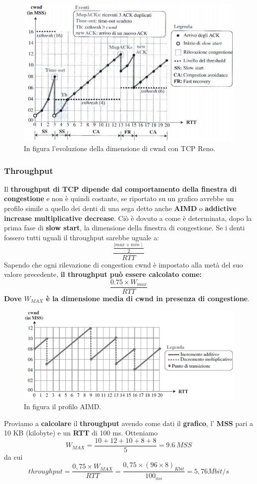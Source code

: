 \documentclass[11pt,a4paper,oneside]{book}
\theoremstyle{definition}
\begin{document}
\begin{figure}[!h]
	\includegraphics[scale=0.31]{Immagini/Reno2.png}
	\centering
	\caption{In figura l'evoluzione della dimensione di cwnd con TCP Reno.}
\end{figure}

\pagebreak

\subsubsection{Throughput}
Il \textbf{throughput di TCP dipende dal comportamento della finestra di congestione} e non è quindi costante, se riportato su un grafico avrebbe un profilo simile a quello dei denti di una sega detto anche \textbf{AIMD} o \textbf{addictive increase multiplicative decrease}. Ciò è dovuto a come è determinata, dopo la prima fase di \textbf{slow start}, la dimensione della finestra di congestione. Se i denti fossero tutti uguali il throughput sarebbe uguale a:\[\frac{\frac{\mid max + min \mid }{2}}{RTT}\]
Sapendo che ogni rilevazione di congestion cwnd è impostato alla metà del suo valore precedente, \textbf{il throughput può essere calcolato come:}
\[\frac{ 0.75 \times W_{max}}{RTT}\]
\textbf{Dove $W_{MAX}$ è la dimensione media di cwnd in presenza di congestione}.
\begin{figure}[!h]
	\includegraphics[scale=0.6]{Immagini/Cwnd_ex.png}
	\centering
	\caption{In figura il profilo AIMD.}
\end{figure}\newline
Proviamo a \textbf{calcolare} il \textbf{throughput} avendo come dati il \textbf{grafico}, l' \textbf{MSS} pari a 10 KB (kilobyte) e un \textbf{RTT} di 100 ms. Otteniamo
\[W_{MAX} = \frac{10 + 12 + 10 + 8 + 8}{5} = 9.6 \ MSS\]
da cui
\[throughput =  \frac{0,75 \times W_{MAX}}{RTT}  = \frac{0,75 \times (96 \times 8)_{Kbit}}{100_{ms}} = 5,76 Mbit/s\]
\end{document}
